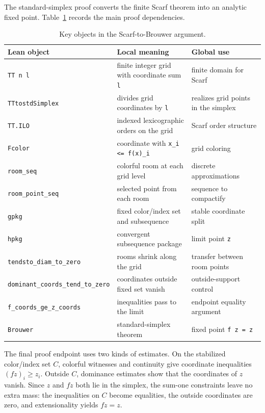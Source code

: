 \documentclass{article}
\theoremstyle{definition}
\begin{document}
The standard-simplex proof converts the finite Scarf theorem into an analytic fixed point. Table~\ref{tab:appendix-brouwer-components} records the main proof dependencies.

\begin{table}[H]
\caption{Key objects in the Scarf-to-Brouwer argument.}
\label{tab:appendix-brouwer-components}
\begin{center}
    \begin{small}
      \begin{tabular}{lll}
\toprule
Lean object & Local meaning & Global use \\
\midrule
\texttt{TT n l} & finite integer grid with coordinate sum \texttt{l} & finite domain for Scarf \\
\texttt{TTtostdSimplex} & divides grid coordinates by \texttt{l} & realizes grid points in the simplex \\
\texttt{TT.ILO} & indexed lexicographic orders on the grid & Scarf order structure \\
\texttt{Fcolor} & coordinate with \texttt{x\_i <= f(x)\_i} & grid coloring \\
\texttt{room\_seq} & colorful room at each grid level & discrete approximations \\
\texttt{room\_point\_seq} & selected point from each room & sequence to compactify \\
\texttt{gpkg} & fixed color/index set and subsequence & stable coordinate split \\
\texttt{hpkg} & convergent subsequence package & limit point \texttt{z} \\
\texttt{tendsto\_diam\_to\_zero} & rooms shrink along the grid & transfer between room points \\
\texttt{dominant\_coords\_tend\_to\_zero} & coordinates outside fixed set vanish & outside-support control \\
\texttt{f\_coords\_ge\_z\_coords} & inequalities pass to the limit & endpoint equality argument \\
\texttt{Brouwer} & standard-simplex theorem & fixed point \texttt{f z = z} \\
\bottomrule
\end{tabular}
    \end{small}
  \end{center}
  \vskip -0.1in
\end{table}

The final proof endpoint uses two kinds of estimates. On the stabilized color/index set \(C\), colorful witnesses and continuity give coordinate inequalities \((f z)_i \geq z_i\). Outside \(C\), dominance estimates show that the coordinates of \(z\) vanish. Since \(z\) and \(f z\) both lie in the simplex, the sum-one constraints leave no extra mass: the inequalities on \(C\) become equalities, the outside coordinates are zero, and extensionality yields \(f z = z\).
\end{document}
